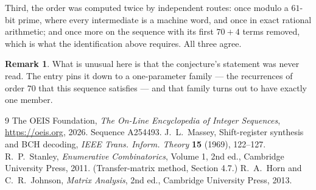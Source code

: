 \documentclass[11pt,a4paper]{article}
\theoremstyle{plain}
\theoremstyle{definition}
\newtheorem{remark}[theorem]{Remark}
\begin{document}
Third, the order was computed twice by independent routes: once modulo a $61$-bit prime, where
every intermediate is a machine word, and once in exact rational arithmetic; and once more on
the sequence with its first $70+4$ terms removed, which is what the identification above
requires. All three agree.

\begin{remark}
What is unusual here is that the conjecture's statement was never read. The entry pins it down
to a one-parameter family --- the recurrences of order $70$ that this sequence satisfies
--- and that family turns out to have exactly one member.
\end{remark}

\begin{thebibliography}{9}
 The OEIS Foundation, \emph{The On-Line Encyclopedia of Integer
Sequences}, \url{https://oeis.org}, 2026. Sequence A254493.
 J.~L.~Massey, Shift-register synthesis and BCH decoding, \emph{IEEE
Trans. Inform. Theory} \textbf{15} (1969), 122--127.
 R.~P.~Stanley, \emph{Enumerative Combinatorics}, Volume 1, 2nd ed.,
Cambridge University Press, 2011. (Transfer-matrix method, Section 4.7.)
 R.~A.~Horn and C.~R.~Johnson, \emph{Matrix Analysis}, 2nd ed., Cambridge
University Press, 2013.
\end{thebibliography}
\end{document}
